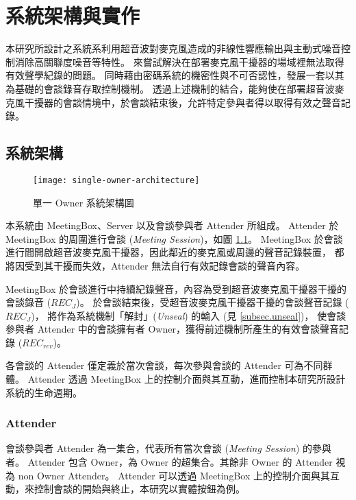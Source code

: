 \chapter{系統架構與實作}

    本研究所設計之系統系利用超音波對麥克風造成的非線性響應輸出與主動式噪音控制消除高關聯度噪音等特性。
來嘗試解決在部署麥克風干擾器的場域裡無法取得有效聲學紀錄的問題。
同時藉由密碼系統的機密性與不可否認性，發展一套以其為基礎的會談錄音存取控制機制。
透過上述機制的結合，能夠使在部署超音波麥克風干擾器的會談情境中，於會談結束後，允許特定參與者得以取得有效之聲音記錄。


\section{系統架構}

\begin{figure}[H]
    \centering
    \texttt{[image: single-owner-architecture]}
    \caption{單一 Owner 系統架構圖}
    \label{fig.s-o-arch}
\end{figure}

    本系統由 MeetingBox、Server 以及會談參與者 Attender 所組成。
Attender 於 MeetingBox 的周圍進行會談 ({\it Meeting Session})，如圖 \ref{fig.s-o-arch}。
MeetingBox 於會談進行間開啟超音波麥克風干擾器，因此鄰近的麥克風或周邊的聲音記錄裝置，
都將因受到其干擾而失效，Attender 無法自行有效記錄會談的聲音內容。

    MeetingBox 於會談進行中持續紀錄聲音，內容為受到超音波麥克風干擾器干擾的會談錄音 ($REC_{J}$)。
於會談結束後，受超音波麥克風干擾器干擾的會談聲音記錄 ($REC_{J}$)，
將作為系統機制「解封」({\it Unseal}) 的輸入 (見 \ref{subsec.unseal})，
使會談參與者 Attender 中的會談擁有者 Owner，獲得前述機制所產生的有效會談聲音記錄 ($REC_{rev}$)。

    各會談的 Attender 僅定義於當次會談，每次參與會談的 Attender 可為不同群體。
Attender 透過 MeetingBox 上的控制介面與其互動，進而控制本研究所設計系統的生命週期。


\subsection{Attender}

    會談參與者 Attender 為一集合，代表所有當次會談 ({\it Meeting Session}) 的參與者。
Attender 包含 Owner，為 Owner 的超集合。其餘非 Owner 的 Attender 視為 non Owner Attender。
Attender 可以透過 MeetingBox 上的控制介面與其互動，來控制會談的開始與終止，本研究以實體按鈕為例。

